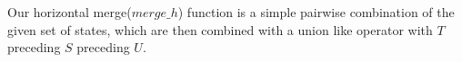 Our horizontal merge($merge\_h$) function is a simple pairwise combination of the given set of states, which are then combined with a union 
like operator with $T$ preceding $S$ preceding $U$.
%
%

